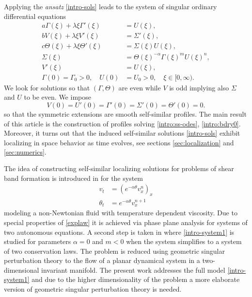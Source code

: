 \documentclass[usletter,11pt]{article}
\theoremstyle{remark}
\begin{document}
Applying the {\it ansatz} \eqref{intro-sols} leads 
to the system of  singular ordinary differential equations
\begin{equation} \label{intro:ss-odes}
\begin{aligned}
 a \Gamma(\xi) + \lambda \xi \Gamma'(\xi) &= U(\xi), \\
 b V(\xi) + \lambda \xi V'(\xi) &= \Sigma'(\xi), \\
 c \Theta(\xi) + \lambda \xi \Theta'(\xi)&=\Sigma(\xi) U(\xi),\\
 \Sigma(\xi) &= \Theta(\xi)^{-\alpha} \Gamma(\xi)^m U(\xi)^n, \\
 V'(\xi)&=U(\xi),\\
 \Gamma(0)=\Gamma_0>0, \quad U(0)&=U_0>0, \quad \text{$\xi \in [0,\infty)$}.
\end{aligned}
\end{equation}
We look for solutions so that $(\Gamma,\Theta)$ are even while  $V$ is odd implying also  $\Sigma$  and $U$ to be even.
We impose
\begin{equation}
 V(0)=U'(0)=\Gamma'(0)=\Sigma'(0)=\Theta'(0)=0. \label{intro:bdry0}
\end{equation}
so that the symmetric extensions are smooth self-similar profiles.
The main result of this article is the construction of profiles solving \eqref{intro:ss-odes}, \eqref{intro:bdry0}. 
Moreover, it turns out that the induced self-similar solutions \eqref{intro-sols}
exhibit localizing in space behavior as time evolves, see sections \ref{sec:localization}
and \ref{sec:numerics}.



The idea of constructing self-similar localizing solutions for problems of shear band formation is introduced in \cite{KOT14} for the system
\begin{equation}
\label{explaw}
\begin{aligned}
v_t &=  ( e^{-\alpha \theta} v_x^n )_x
\\
\theta_t &= e^{-\alpha \theta} v_x^{n+1}
\end{aligned}
\end{equation}
modeling a non-Newtonian fluid with temperature dependent viscosity.
Due to special properties of \eqref{explaw} it is achieved via phase plane analysis for systems of two autonomous equations. A second step is taken in \cite{LT16}
where \eqref{intro-system1} is studied for parameters $\alpha = 0$ and $m < 0$ when the system simplifies to a system of two conservation laws. The problem is reduced 
using geometric singular perturbation theory to the flow of a planar dynamical system in a two-dimensional invariant manifold. The present work addresses
the full model  \eqref{intro-system1} and due to the higher dimensionality of the problem a more elaborate version of geometric singular perturbation theory is needed.
\end{document}
